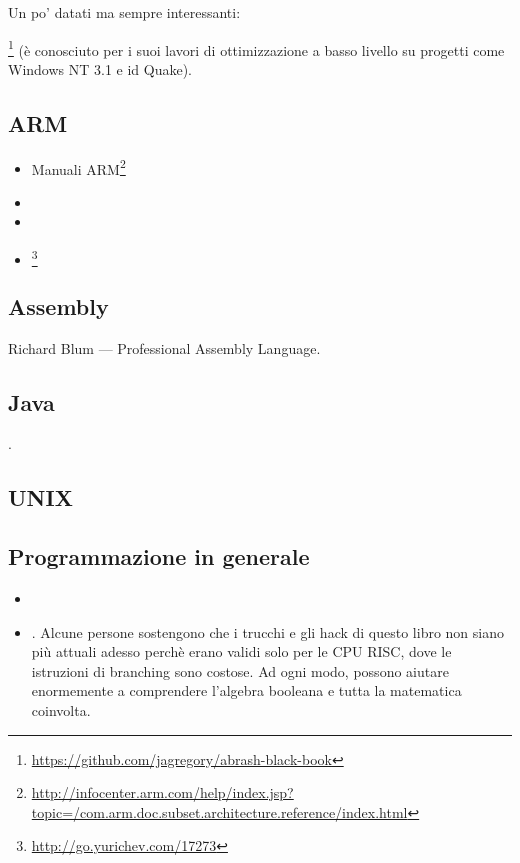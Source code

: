 Un po' datati ma sempre interessanti:

\MAbrash\footnote{\AlsoAvailableAs \url{https://github.com/jagregory/abrash-black-book}}
(è conosciuto per i suoi lavori di ottimizzazione a basso livello su progetti come Windows NT 3.1 e id Quake).

\subsection{ARM}

\begin{itemize}
\item Manuali ARM\footnote{\AlsoAvailableAs \url{http://infocenter.arm.com/help/index.jsp?topic=/com.arm.doc.subset.architecture.reference/index.html}}

\item \ARMSevenRef

\item \ARMSixFourRefURL

\item \ARMCookBook\footnote{\AlsoAvailableAs \url{http://go.yurichev.com/17273}}
\end{itemize}

\subsection{Assembly}

Richard Blum --- Professional Assembly Language.

\subsection{Java}

\JavaBook.

\subsection{UNIX}

\TAOUP

\subsection{Programmazione in generale}

\begin{itemize}

\item \RobPikePractice

\item \HenryWarren.
Alcune persone sostengono che i trucchi e gli hack di questo libro non siano più attuali adesso perchè erano validi solo per le \ac{CPU} \ac{RISC},
dove le istruzioni di branching sono costose.
Ad ogni modo, possono aiutare enormemente a comprendere l'algebra booleana e tutta la matematica coinvolta.

\end{itemize}

